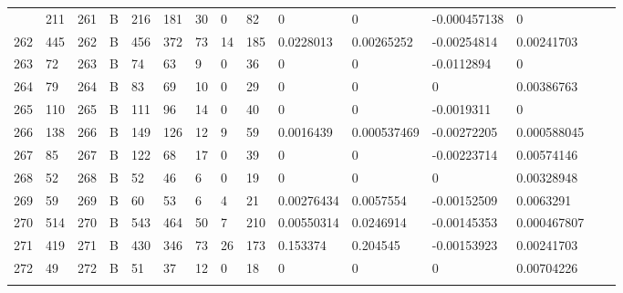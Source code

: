 \begin{longtable}{lllllllllllllll}
\begin{comment}
	261 & 211               & 261 & B   & 216               & 181               & 30                & 0    & 82         & 0              & 0              & -0.000457138  & 0            \\
	262 & 445               & 262 & B   & 456               & 372               & 73                & 14   & 185        & 0.0228013      & 0.00265252     & -0.00254814   & 0.00241703   \\
	263 & 72                & 263 & B   & 74                & 63                & 9                 & 0    & 36         & 0              & 0              & -0.0112894    & 0            \\
	264 & 79                & 264 & B   & 83                & 69                & 10                & 0    & 29         & 0              & 0              & 0             & 0.00386763   \\
	265 & 110               & 265 & B   & 111               & 96                & 14                & 0    & 40         & 0              & 0              & -0.0019311    & 0            \\
	266 & 138               & 266 & B   & 149               & 126               & 12                & 9    & 59         & 0.0016439      & 0.000537469    & -0.00272205   & 0.000588045  \\
	267 & 85                & 267 & B   & 122               & 68                & 17                & 0    & 39         & 0              & 0              & -0.00223714   & 0.00574146   \\
	268 & 52                & 268 & B   & 52                & 46                & 6                 & 0    & 19         & 0              & 0              & 0             & 0.00328948   \\
	269 & 59                & 269 & B   & 60                & 53                & 6                 & 4    & 21         & 0.00276434     & 0.0057554      & -0.00152509   & 0.0063291    \\
	270 & 514               & 270 & B   & 543               & 464               & 50                & 7    & 210        & 0.00550314     & 0.0246914      & -0.00145353   & 0.000467807  \\
	271 & 419               & 271 & B   & 430               & 346               & 73                & 26   & 173        & 0.153374       & 0.204545       & -0.00153923   & 0.00241703   \\
	272 & 49                & 272 & B   & 51                & 37                & 12                & 0    & 18         & 0              & 0              & 0             & 0.00704226   \\

\end{comment}
\end{longtable}
